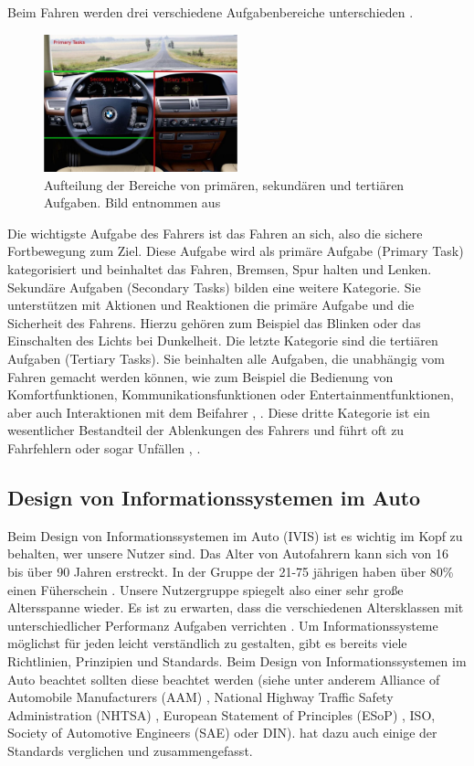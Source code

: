 Beim Fahren werden drei verschiedene Aufgabenbereiche unterschieden \citep{geiser1985man}. 
\begin{figure}
	\centering
	\includegraphics[width=0.5\textwidth]{img/Fahrbereiche_Tonnis.JPG}
	\caption{Aufteilung der Bereiche von primären, sekundären und tertiären Aufgaben. Bild entnommen aus \citet{Tonnis:2006}}
	\label{fig:Fahrbereiche_Tonnis}
\end{figure}
Die wichtigste Aufgabe des Fahrers ist das Fahren an sich, also die sichere Fortbewegung zum Ziel. 
Diese Aufgabe wird als primäre Aufgabe (Primary Task) kategorisiert und beinhaltet das Fahren, Bremsen, Spur halten und Lenken. 
Sekundäre Aufgaben (Secondary Tasks) bilden eine weitere Kategorie.
Sie unterstützen mit Aktionen und Reaktionen die primäre Aufgabe und die Sicherheit des Fahrens.
Hierzu gehören zum Beispiel das Blinken oder das Einschalten des Lichts bei Dunkelheit. 
Die letzte Kategorie sind die tertiären Aufgaben (Tertiary Tasks).
Sie beinhalten alle Aufgaben, die unabhängig vom Fahren gemacht werden können, wie zum Beispiel die Bedienung von Komfortfunktionen, Kommunikationsfunktionen oder Entertainmentfunktionen, aber auch Interaktionen mit dem Beifahrer \citep{geiser1985man}, \citep{Kern:2009}. 
Diese dritte Kategorie ist ein wesentlicher Bestandteil der Ablenkungen des Fahrers und führt oft zu Fahrfehlern oder sogar Unfällen \citep{neale2005overview}, \citep{rumar1988vehicle}. 

\subsection[Design von IVIS]{Design von Informationssystemen im Auto}
Beim Design von Informationssystemen im Auto (IVIS) ist es wichtig im Kopf zu behalten, wer unsere Nutzer sind.
Das Alter von Autofahrern kann sich von 16 bis über 90 Jahren erstreckt. 
In der Gruppe der 21-75 jährigen haben über 80\% einen Füherschein \citep{Green_2002}.
Unsere Nutzergruppe spiegelt also einer sehr große Altersspanne wieder. 
Es ist zu erwarten, dass die verschiedenen Altersklassen mit unterschiedlicher Performanz Aufgaben verrichten \citep{Green_2002}. 
Um Informationssysteme möglichst für jeden leicht verständlich zu gestalten, gibt es bereits viele Richtlinien, Prinzipien und Standards.
Beim Design von Informationssystemen im Auto beachtet sollten diese beachtet werden (siehe unter anderem Alliance of Automobile Manufacturers (AAM) \citep{driver2006statement}, National Highway Traffic Safety Administration (NHTSA) \citep{national2012visual}, European Statement of Principles (ESoP) \citep{national2012recommandationl}, ISO, Society of Automotive Engineers (SAE) oder DIN).
\citet{Green:2012:USI:2390256.2390258} hat dazu auch einige der Standards verglichen und zusammengefasst.

